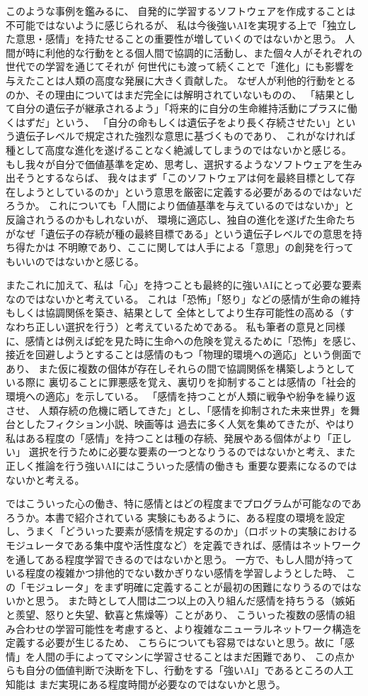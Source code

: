 \documentclass[uplatex]{jsarticle}
\begin{document}
このような事例を鑑みるに、
自発的に学習するソフトウェアを作成することは不可能ではないように感じられるが、
私は今後強いAIを実現する上で「独立した意思・感情」を持たせることの重要性が増していくのではないかと思う。
人間が時に利他的な行動をとる個人間で協調的に活動し、また個々人がそれぞれの世代での学習を通じてそれが
何世代にも渡って続くことで「進化」にも影響を与えたことは人類の高度な発展に大きく貢献した。
なぜ人が利他的行動をとるのか、その理由についてはまだ完全には解明されていないものの、
「結果として自分の遺伝子が継承されるよう」「将来的に自分の生命維持活動にプラスに働くはずだ」という、
「自分の命もしくは遺伝子をより長く存続させたい」という遺伝子レベルで規定された強烈な意思に基づくものであり、
これがなければ種として高度な進化を遂げることなく絶滅してしまうのではないかと感じる。
もし我々が自分で価値基準を定め、思考し、選択するようなソフトウェアを生み出そうとするならば、
我々はまず「このソフトウェアは何を最終目標として存在しようとしているのか」という意思を厳密に定義する必要があるのではないだろうか。
これについても「人間により価値基準を与えているのではないか」と反論されうるのかもしれないが、
環境に適応し、独自の進化を遂げた生命たちがなぜ「遺伝子の存続が種の最終目標である」という遺伝子レベルでの意思を持ち得たかは
不明瞭であり、ここに関しては人手による「意思」の創発を行ってもいいのではないかと感じる。

またこれに加えて、私は「心」を持つことも最終的に強いAIにとって必要な要素なのではないかと考えている。
これは「恐怖」「怒り」などの感情が生命の維持もしくは協調関係を築き、結果として
全体としてより生存可能性の高める（すなわち正しい選択を行う）と考えているためである。
私も筆者の意見と同様に、感情とは例えば蛇を見た時に生命への危険を覚えるために「恐怖」を感じ、
接近を回避しようとすることは感情のもつ「物理的環境への適応」という側面であり、
また仮に複数の個体が存在しそれらの間で協調関係を構築しようとしている際に
裏切ることに罪悪感を覚え、裏切りを抑制することは感情の「社会的環境への適応」を示している。
「感情を持つことが人類に戦争や紛争を繰り返させ、
人類存続の危機に晒してきた」とし、「感情を抑制された未来世界」を舞台としたフィクション小説、映画等は
過去に多く人気を集めてきたが、やはり私はある程度の「感情」を持つことは種の存続、発展やある個体がより「正しい」
選択を行うために必要な要素の一つとなりうるのではないかと考え、また正しく推論を行う強いAIにはこういった感情の働きも
重要な要素になるのではないかと考える。

ではこういった心の働き、特に感情とはどの程度までプログラムが可能なのであろうか。本書で紹介されている
実験にもあるように、ある程度の環境を設定し、うまく「どういった要素が感情を規定するのか」（ロボットの実験における
モジュレータである集中度や活性度など）を定義できれば、感情はネットワークを通してある程度学習できるのではないかと思う。
一方で、もし人間が持っている程度の複雑かつ排他的でない数かぎりない感情を学習しようとした時、
この「モジュレータ」をまず明確に定義することが最初の困難になりうるのではないかと思う。
また時として人間は二つ以上の入り組んだ感情を持ちうる（嫉妬と羨望、怒りと失望、歓喜と焦燥等）ことがあり、
こういった複数の感情の組み合わせの学習可能性を考慮すると、より複雑なニューラルネットワーク構造を定義する必要が生じるため、
こちらについても容易ではないと思う。故に「感情」を人間の手によってマシンに学習させることはまだ困難であり、
この点からも自分の価値判断で決断を下し、行動をする「強いAI」であるところの人工知能は
まだ実現にある程度時間が必要なのではないかと思う。
\end{document}

